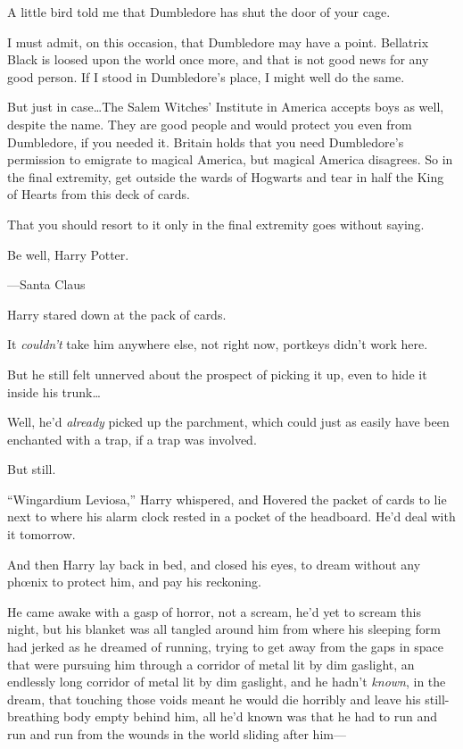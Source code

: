 \begin{writtenNote}
A little bird told me that Dumbledore has shut the door of your cage.

I must admit, on this occasion, that Dumbledore may have a point. Bellatrix Black is loosed upon the world once more, and that is not good news for any good person. If I stood in Dumbledore’s place, I might well do the same.

But just in case…The Salem Witches’ Institute in America accepts boys as well, despite the name. They are good people and would protect you even from Dumbledore, if you needed it. Britain holds that you need Dumbledore’s permission to emigrate to magical America, but magical America disagrees. So in the final extremity, get outside the wards of Hogwarts and tear in half the King of Hearts from this deck of cards.

That you should resort to it only in the final extremity goes without saying.

Be well, Harry Potter.

—Santa Claus
\end{writtenNote}

Harry stared down at the pack of cards.

It \emph{couldn’t} take him anywhere else, not right now, portkeys didn’t work here.

But he still felt unnerved about the prospect of picking it up, even to hide it inside his trunk…

Well, he’d \emph{already} picked up the parchment, which could just as easily have been enchanted with a trap, if a trap was involved.

But still.

“Wingardium Leviosa,” Harry whispered, and Hovered the packet of cards to lie next to where his alarm clock rested in a pocket of the headboard. He’d deal with it tomorrow.

And then Harry lay back in bed, and closed his eyes, to dream without any phœnix to protect him, and pay his reckoning.

\later

He came awake with a gasp of horror, not a scream, he’d yet to scream this night, but his blanket was all tangled around him from where his sleeping form had jerked as he dreamed of running, trying to get away from the gaps in space that were pursuing him through a corridor of metal lit by dim gaslight, an endlessly long corridor of metal lit by dim gaslight, and he hadn’t \emph{known}, in the dream, that touching those voids meant he would die horribly and leave his still-breathing body empty behind him, all he’d known was that he had to run and run and run from the wounds in the world sliding after him—

